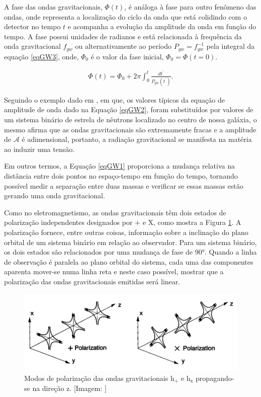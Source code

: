 A fase das ondas gravitacionais, $\Phi (t)$, é análoga à fase para outro fenômeno das ondas, onde representa a localização do ciclo da onda que está colidindo com o detector no tempo $t$ e acompanha a evolução da amplitude da onda em função do tempo. A fase possui unidades de radianos e está relacionada à frequência da onda gravitacional $f_{gw}$ ou alternativamente ao período $P_{gw} = {f_{gw}^{-1}}$ pela integral da equação \ref{eqGW3}, onde, $\Phi_0$ é o valor da fase inicial, $\Phi_0=\Phi(t=0)$.

\begin{equation} \label{eqGW3}
\begin{split}
\Phi(t) = \Phi_0 + 2\pi \int_0^t \! \frac{{dt}^{'}}{P_{gw}(t^{'})}.
\end{split}
\end{equation}

Seguindo o exemplo dado em \cite{rubbo2007hands}, em que, os valores típicos da equação de amplitude de onda dado na Equação \ref{eqGW2}, foram substituídos por valores de um sistema binário de estrela de nêutrons localizado no centro de nossa galáxia, o mesmo afirma que as ondas gravitacionais são extremamente fracas e a amplitude de $\mathcal{A}$ é adimensional, portanto, a radiação gravitacional se manifesta na matéria ao induzir uma tensão. 

Em outros termos, a Equação \ref{eqGW1} proporciona a mudança relativa na distância entre dois pontos no espaço-tempo em função do tempo, tornando possível medir a separação entre duas massas e verificar se essas massas estão gerando uma onda gravitacional.

Como no eletromagnetismo, as ondas gravitacionais têm dois estados de polarização independentes designados por $\boldsymbol{+}$ e $\mathrm{X}$, como mostra a Figura \ref{figpolarization}. A polarização fornece, entre outras coisas, informação sobre a inclinação do plano orbital de um sistema binário em relação ao observador. Para um sistema binário, os dois estados são relacionados por uma mudança de fase de $90°$. Quando a linha de observação é paralela ao plano orbital do sistema, cada uma das componentes aparenta mover-se numa linha reta e neste caso possível, mostrar que a polarização das ondas gravitacionais emitidas será linear. 

\begin{figure}[ht]
\centering
\includegraphics[width=.9\textwidth]{figuras/polarization.png}
\caption{Modos de polarização das ondas gravitacionais $\mathrm{h_{+}}$ e $\mathrm{h_{x}}$ propagando-se na direção $\mathrm{z}$. [Imagem: \cite{centrella2010black}]}
\label{figpolarization}
\end{figure}

